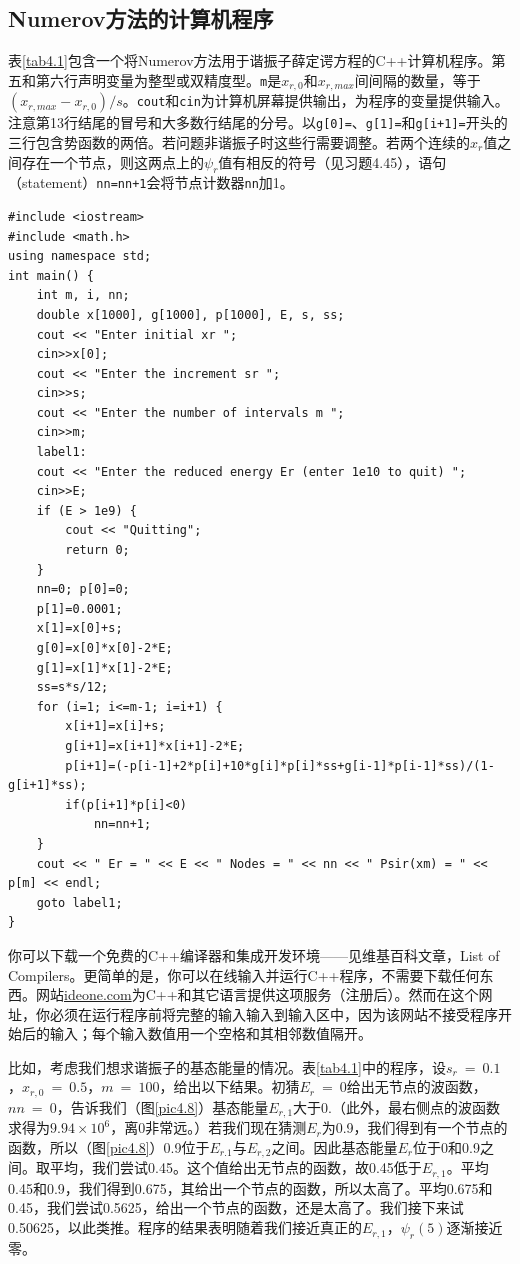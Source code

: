 \documentclass[12pt,a4paper,openany]{ctexbook}
\begin{document}
\subsection{Numerov方法的计算机程序}
\begin{flushleft}
    \setlength{\parindent}{2em}
表\ref{tab4.1}包含一个将Numerov方法用于谐振子薛定谔方程的C++计算机程序。第五和第六行声明变量为整型或双精度型。\texttt{m}是$x_{r,0}$和$x_{r,max}$间间隔的数量，等于$(x_{r,max}-x_{r,0})/s$。\texttt{cout}和\texttt{cin}为计算机屏幕提供输出，为程序的变量提供输入。注意第13行结尾的冒号和大多数行结尾的分号。以\texttt{g[0]=}、\texttt{g[1]=}和\texttt{g[i+1]=}开头的三行包含势函数的两倍。若问题非谐振子时这些行需要调整。若两个连续的$x_r$值之间存在一个节点，则这两点上的$\psi_r$值有相反的符号（见习题4.45），语句（statement）\texttt{nn=nn+1}会将节点计数器\texttt{nn}加1。
\begin{table}[htbp]
  \centering
  \caption{将Numerov方法用于谐振子薛定谔方程的C++程序}
  \label{tab4.1}
  \begin{lstlisting}[style=cppstyle]
#include <iostream>
#include <math.h>
using namespace std;
int main() {
    int m, i, nn;
    double x[1000], g[1000], p[1000], E, s, ss;
    cout << "Enter initial xr ";
    cin>>x[0];
    cout << "Enter the increment sr ";
    cin>>s;
    cout << "Enter the number of intervals m ";
    cin>>m;
    label1:
    cout << "Enter the reduced energy Er (enter 1e10 to quit) ";
    cin>>E;
    if (E > 1e9) {
        cout << "Quitting";
        return 0;
    }
    nn=0; p[0]=0;
    p[1]=0.0001;
    x[1]=x[0]+s;
    g[0]=x[0]*x[0]-2*E;
    g[1]=x[1]*x[1]-2*E;
    ss=s*s/12;
    for (i=1; i<=m-1; i=i+1) {
        x[i+1]=x[i]+s;
        g[i+1]=x[i+1]*x[i+1]-2*E;
        p[i+1]=(-p[i-1]+2*p[i]+10*g[i]*p[i]*ss+g[i-1]*p[i-1]*ss)/(1-g[i+1]*ss);
        if(p[i+1]*p[i]<0)
            nn=nn+1;
    }
    cout << " Er = " << E << " Nodes = " << nn << " Psir(xm) = " << p[m] << endl;
    goto label1;
}
  \end{lstlisting}
\end{table}
你可以下载一个免费的C++编译器和集成开发环境——见维基百科文章，List of Compilers。更简单的是，你可以在线输入并运行C++程序，不需要下载任何东西。网站\url{ideone.com}为C++和其它语言提供这项服务（注册后）。然而在这个网址，你必须在运行程序前将完整的输入输入到输入区中，因为该网站不接受程序开始后的输入；每个输入数值用一个空格和其相邻数值隔开。


比如，考虑我们想求谐振子的基态能量的情况。表\ref{tab4.1}中的程序，设$s_r\ =\ 0.1$，$x_{r,0}\ =\ 0.5$，$m\ =\ 100$，给出以下结果。初猜$E_r\ =\ 0$给出无节点的波函数，$nn\ =\ 0$，告诉我们（图\ref{pic4.8}）基态能量$E_{r,1}$大于0.（此外，最右侧点的波函数求得为$9.94\times10^6$，离0非常远。）若我们现在猜测$E_r$为0.9，我们得到有一个节点的函数，所以（图\ref{pic4.8}）0.9位于$E_{r.1}$与$E_{r,2}$之间。因此基态能量$E_r$位于0和0.9之间。取平均，我们尝试0.45。这个值给出无节点的函数，故0.45低于$E_{r,1}$。平均0.45和0.9，我们得到0.675，其给出一个节点的函数，所以太高了。平均0.675和0.45，我们尝试0.5625，给出一个节点的函数，还是太高了。我们接下来试0.50625，以此类推。程序的结果表明随着我们接近真正的$E_{r,1}$，$\psi_r(5)$逐渐接近零。
\end{flushleft}
\end{document}
